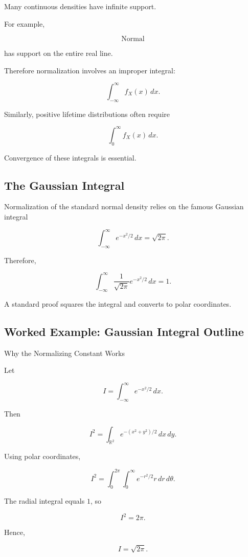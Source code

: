 Many continuous densities have infinite support.

For example,

\[
\operatorname{Normal}
\]

has support on the entire real line.

Therefore normalization involves an improper integral:

\[
\boxed{
\int_{-\infty}^{\infty}
f_X(x)\,dx.
}
\]

Similarly, positive lifetime distributions often require

\[
\boxed{
\int_0^\infty
f_X(x)\,dx.
}
\]

Convergence of these integrals is essential.

\subsection{The Gaussian Integral}
\label{subsec:gaussian-integral}

Normalization of the standard normal density relies on the famous
Gaussian integral

\[
\boxed{
\int_{-\infty}^{\infty}
e^{-x^2/2}\,dx
=
\sqrt{2\pi}.
}
\]

Therefore,

\[
\boxed{
\int_{-\infty}^{\infty}
\frac1{\sqrt{2\pi}}
e^{-x^2/2}\,dx
=
1.
}
\]

A standard proof squares the integral and converts to polar coordinates.

\subsection{Worked Example: Gaussian Integral Outline}
\label{subsec:worked-gaussian-integral-outline}

\begin{workedexamplebox}{Why the Normalizing Constant Works}

Let

\[
I
=
\int_{-\infty}^{\infty}
e^{-x^2/2}\,dx.
\]

Then

\[
I^2
=
\int_{\mathbb{R}^2}
e^{-(x^2+y^2)/2}\,dx\,dy.
\]

Using polar coordinates,

\[
I^2
=
\int_0^{2\pi}
\int_0^\infty
e^{-r^2/2}
r\,dr\,d\theta.
\]

The radial integral equals \(1\), so

\[
I^2=2\pi.
\]

Hence,

\begin{answerbox}
\[
\boxed{
I=\sqrt{2\pi}.
}
\]
\end{answerbox}

\end{workedexamplebox}

